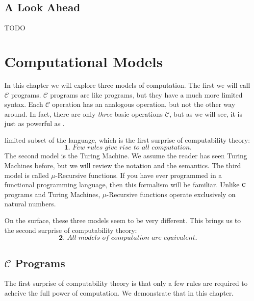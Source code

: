 \documentclass[english, 12pt]{article}
\begin{document}
  \subsection{A Look Ahead}
  TODO

  \section{Computational Models}
  In this chapter we will explore three models of computation. The first
  we will call $\mathcal{C}$ programs. $\mathcal{C}$ programs are like \pC 
  programs, but they have a much more limited syntax. Each $\mathcal{C}$
  operation has an analogous \pC operation, but not the other way around.
  In fact, there are only {\it three} basic operations $\mathcal{C}$, but as we will 
  see, it is just as powerful as \pC.
   
  limited subset of the language, which is the first surprise of computability
  theory:
  \[ \textbf{1. }\textit{Few rules give rise to all computation.} \]
  The second model is the Turing Machine. We assume the reader has seen
  Turing Machines before, but we will review the notation and the semantics.
  The third model is called $\mu$-Recursive functions. If you have ever
  programmed in a functional programming language, then this formalism will
  be familiar. Unlike ${\texttt{C}}$ programs and Turing Machines, $\mu$-Recursive
  functions operate exclusively on natural numbers. \n

  On the surface, these three models seem to be very different. This brings
  us to the second surprise of computability theory:
  \[ \textbf{2. } \textit{All models of computation are equivalent.} \]
  
  \subsection{$\mathcal{C}$ Programs}
  The first surprise of computability theory is that only a few rules
  are required to acheive the full power of computation. We demonstrate
  that in this chapter. \n
\end{document}
